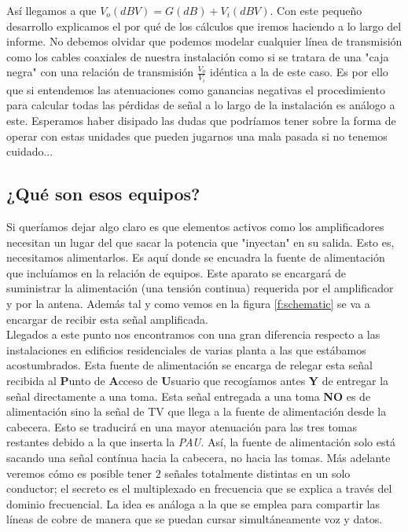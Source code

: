 \documentclass{article}[12 pt]
\begin{document}
			Así llegamos a que $V_o(dBV) = G(dB) + V_i(dBV)$. Con este pequeño desarrollo explicamos el por qué de los cálculos que iremos haciendo a lo largo del informe. No debemos olvidar que podemos modelar cualquier línea de transmisión como los cables coaxiales de nuestra instalación como si se tratara de una "caja negra" con una relación de transmisión $\frac{V_o}{V_i}$ idéntica a la de este caso. Es por ello que si entendemos las atenuaciones como ganancias negativas el procedimiento para calcular todas las pérdidas de señal a lo largo de la instalación es análogo a este. Esperamos haber disipado las dudas que podríamos tener sobre la forma de operar con estas unidades que pueden jugarnos una mala pasada si no tenemos cuidado...\\

		\subsection{¿Qué son esos equipos?}
			Si queríamos dejar algo claro es que elementos activos como los amplificadores necesitan un lugar del que sacar la potencia que "inyectan" en su salida. Esto es, necesitamos alimentarlos. Es aquí donde se encuadra la fuente de alimentación que incluíamos en la relación de equipos. Este aparato se encargará de suministrar la alimentación (una tensión continua) requerida por el amplificador y por la antena. Además tal y como vemos en la figura \ref{f:schematic} se va a encargar de recibir esta señal amplificada.\\

			Llegados a este punto nos encontramos con una gran diferencia respecto a las instalaciones en edificios residenciales de varias planta a las que estábamos acostumbrados. Esta fuente de alimentación se encarga de relegar esta señal recibida al \textbf{P}unto de \textbf{A}cceso de \textbf{U}suario que recogíamos antes \textbf{Y} de entregar la señal directamente a una toma. Esta señal entregada a una toma \textbf{NO} es de alimentación sino la señal de TV que llega a la fuente de alimentación desde la cabecera. Esto se traducirá en una mayor atenuación para las tres tomas restantes debido a la que inserta la \textit{PAU}. Así, la fuente de alimentación solo está sacando una señal contínua hacia la cabecera, no hacia las tomas. Más adelante veremos cómo es posible tener $2$ señales totalmente distintas en un solo conductor; el secreto es el multiplexado en frecuencia que se explica a través del dominio frecuencial. La idea es análoga a la que se emplea para compartir las líneas de cobre de manera que se puedan cursar simultáneamente voz y datos.\\
\end{document}

